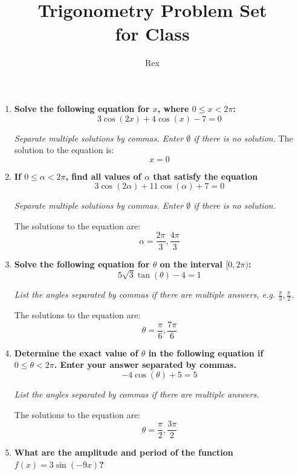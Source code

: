 \documentclass[12pt]{article}
\title{
    \vspace{2in}
    \textbf{Trigonometry Problem Set}\\
    \vspace{0.1in}
    \large for Class\\
    \vspace{3in}
}
\author{Rex}
\date{}
\begin{document}
\maketitle
\newpage

\begin{enumerate}
    \item \textbf{Solve the following equation for \( x \), where \( 0 \leq x < 2\pi \):}
    \[ 3\cos(2x) + 4\cos(x) - 7 = 0 \]
    
    \textit{Separate multiple solutions by commas. Enter \( \emptyset \) if there is no solution.}
    The solution to the equation is:
    \[ x = 0 \]
    \vspace{45mm}

    \item \textbf{If \( 0 \leq \alpha < 2\pi \), find all values of \( \alpha \) that satisfy the equation}
    \[ 3\cos(2\alpha) + 11\cos(\alpha) + 7 = 0 \]
    
    \textit{Separate multiple solutions by commas. Enter \( \emptyset \) if there is no solution.}
    
    The solutions to the equation are:
    \[ \alpha = \frac{2\pi}{3}, \frac{4\pi}{3} \]
    \vspace{45mm}
   \newpage 
    \item \textbf{Solve the following equation for \( \theta \) on the interval \( [0,2\pi) \):}
    \[ 5\sqrt{3} \tan(\theta) - 4 = 1 \]
    
    \textit{List the angles separated by commas if there are multiple answers, e.g. \( \frac{\pi}{3}, \frac{\pi}{2} \).}
    
    The solutions to the equation are:
    \[ \theta = \frac{\pi}{6}, \frac{7\pi}{6} \]
    \vspace{45mm}

    \item \textbf{Determine the exact value of \( \theta \) in the following equation if \( 0 \leq \theta < 2\pi \). Enter your answer separated by commas.}
    \[ -4\cos(\theta) + 5 = 5 \]
    
    \textit{List the angles separated by commas if there are multiple answers.}
    
    The solutions to the equation are:
    \[ \theta = \frac{\pi}{2}, \frac{3\pi}{2} \]
    \vspace{45mm}
   \newpage 
    \item \textbf{What are the amplitude and period of the function \( f(x) = 3\sin(-9x) \)?}
    

\end{enumerate}
\end{document}
